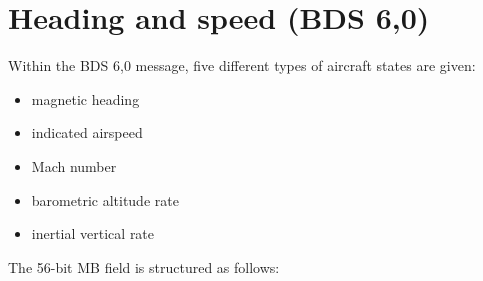 \section{Heading and speed (BDS 6,0)}\label{heading-and-speed-bds-60}

Within the BDS 6,0 message, five different types of aircraft states are
given:

\begin{itemize}
\item
  magnetic heading
\item
  indicated airspeed
\item
  Mach number
\item
  barometric altitude rate
\item
  inertial vertical rate
\end{itemize}

The 56-bit MB field is structured as follows:

